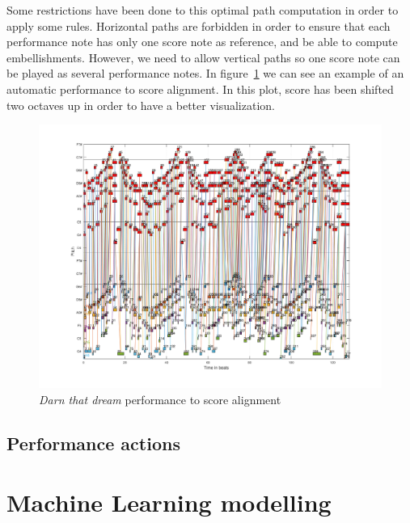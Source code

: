 Some restrictions have been done to this optimal path computation in order to apply some rules. Horizontal paths are forbidden in order to ensure that each performance note has only one score note as reference, and be able to compute embellishments. However, we need to allow vertical paths so one score note can be played as several performance notes. In figure~\ref{fig:darn_auto_alignment} we can see an example of an automatic performance to score alignment. In this plot, score has been shifted two octaves up in order to have a better visualization.

\begin{figure}[ht!]
\caption{\textit{Darn that dream} performance to score alignment}
\label{fig:darn_auto_alignment}
\centering
\includegraphics[width=\textwidth]{Figures/Darn_that_dream_auto.pdf}
\end{figure}



\subsection{Performance actions}

\section{Machine Learning modelling}
\cleardoublepage

